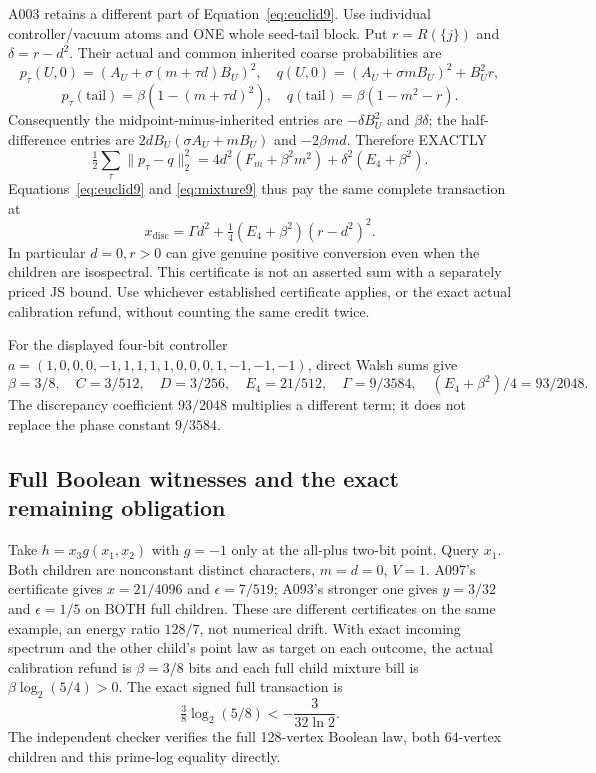 \documentclass[11pt]{article}
\begin{document}
A003 retains a different part of Equation~\eqref{eq:euclid9}.
Use individual controller/vacuum atoms and ONE whole seed-tail block.
Put $r=R(\{j\})$ and $\delta=r-d^2$.
Their actual and common inherited coarse probabilities are
\[
p_\tau(U,0)=(A_U+\sigma(m+\tau d)B_U)^2,\quad
q(U,0)=(A_U+\sigma mB_U)^2+B_U^2r,
\]
\[
p_\tau(\mathrm{tail})=\beta(1-(m+\tau d)^2),\quad
q(\mathrm{tail})=\beta(1-m^2-r).
\]
Consequently the midpoint-minus-inherited entries are $-\delta B_U^2$
and $\beta\delta$; the half-difference entries are
$2dB_U(\sigma A_U+mB_U)$ and $-2\beta md$. Therefore EXACTLY
\[
\tfrac12\sum_\tau\|p_\tau-q\|_2^2
=4d^2(F_m+\beta^2m^2)+\delta^2(E_4+\beta^2).
\]
Equations~\eqref{eq:euclid9} and \eqref{eq:mixture9} thus pay the
same complete transaction at
\[
x_{\mathrm{disc}}=\Gamma d^2+
\tfrac14(E_4+\beta^2)(r-d^2)^2.
\tag{PD9}\label{eq:discrepancy9}
\]
In particular $d=0,r>0$ can give genuine positive conversion even
when the children are isospectral. This certificate is not an asserted
sum with a separately priced JS bound. Use whichever established
certificate applies, or the exact actual calibration refund, without
counting the same credit twice.

For the displayed four-bit controller
$a=(1,0,0,0,-1,1,1,1,1,0,0,0,1,-1,-1,-1)$,
direct Walsh sums give
\[
\beta=3/8,\quad C=3/512,\quad D=3/256,\quad E_4=21/512,
\quad\Gamma=9/3584,\quad(E_4+\beta^2)/4=93/2048.
\]
The discrepancy coefficient $93/2048$ multiplies a different term;
it does not replace the phase constant $9/3584$.

\subsection{Full Boolean witnesses and the exact remaining obligation}
\label{sec:null9}
Take $h=x_3g(x_1,x_2)$ with $g=-1$ only at the all-plus two-bit point.
Query $x_1$. Both children are nonconstant distinct characters,
$m=d=0$, $V=1$. A097's certificate gives
$x=21/4096$ and $\epsilon=7/519$; A093's stronger one gives
$y=3/32$ and $\epsilon=1/5$ on BOTH full children.
These are different certificates on the same example, an energy ratio
$128/7$, not numerical drift. With exact incoming spectrum and the
other child's point law as target on each outcome, the actual
calibration refund is $\beta=3/8$ bits and each full child mixture
bill is $\beta\log_2(5/4)>0$. The exact signed full transaction is
\[
\tfrac38\log_2(5/8)<-\frac{3}{32\ln2}.
\]
The independent checker verifies the full 128-vertex Boolean law,
both 64-vertex children and this prime-log equality directly.
\end{document}
